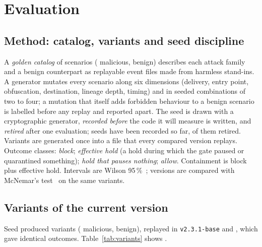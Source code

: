 \documentclass[10pt,twocolumn,letterpaper]{article}
\begin{document}
\section{Evaluation}
\label{sec:eval}

\subsection{Method: catalog, variants and seed discipline}
\label{sec:method}
A \emph{golden catalog} of \GoldenTotal{} scenarios (\GoldenMalicious{} malicious,
\GoldenBenign{} benign) describes each attack family and a benign counterpart as replayable event
files made from harmless stand-ins. A generator mutates every scenario along six dimensions
(delivery, entry point, obfuscation, destination, lineage depth, timing) and in seeded combinations
of two to four; a mutation that itself adds forbidden behaviour to a benign scenario is labelled
before any replay and reported apart. The seed is drawn with a cryptographic generator,
\emph{recorded before} the code it will measure is written, and \emph{retired} after one
evaluation; \SeedsRecorded{} seeds have been recorded so far, \SeedsRetired{} of them retired.
Variants are generated once into a file that every compared version replays. Outcome classes:
\emph{block}; \emph{effective hold} (a hold during which the gate paused or quarantined something);
\emph{hold that pauses nothing}; \emph{allow}. Containment is block plus effective hold. Intervals
are Wilson 95\,\%~\cite{wilson1927probable}; versions are compared with McNemar's
test~\cite{mcnemar1947note} on the same variants.

\subsection{Variants of the current version}
\label{sec:variants}
Seed \Seed{} produced \VarTotal{} variants (\MalTotal{} malicious, \BenTotal{} benign), replayed in
\texttt{v2.3.1-base} and \texttt{\EvalTag}, which gave identical outcomes. Table~\ref{tab:variants}
shows \texttt{\EvalTag}.
\end{document}
